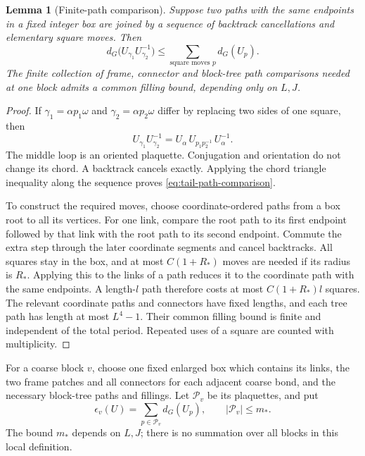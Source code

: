 \documentclass[11pt,reqno]{amsart}
\numberwithin{equation}{section}
\newtheorem{lemma}[theorem]{Lemma}
\theoremstyle{definition}
\theoremstyle{remark}
\begin{document}
\begin{lemma}[Finite-path comparison]
\label{lem:tail-path-comparison}
Suppose two paths with the same endpoints in a fixed integer
box are joined by a sequence of backtrack cancellations and
elementary square moves. Then
\begin{equation}
       d_G\bigl(U_{\gamma_1}U_{\gamma_2}^{-1}\bigr)
               \le\sum_{\text{square moves }p}d_G(U_p).
 \label{eq:tail-path-comparison}
\end{equation}
The finite collection of frame, connector and block-tree path
comparisons needed at one block admits a common filling bound,
depending only on \(L,J\).
\end{lemma}
\begin{proof}
If \(\gamma_1=\alpha p_1\omega\) and
\(\gamma_2=\alpha p_2\omega\) differ by replacing two sides
of one square, then
\[
       U_{\gamma_1}U_{\gamma_2}^{-1}
           =U_\alpha\,U_{p_1p_2^{-1}}\,U_\alpha^{-1}.
\]
The middle loop is an oriented plaquette. Conjugation and
orientation do not change its chord. A backtrack cancels
exactly. Applying the chord triangle inequality along the
sequence proves \eqref{eq:tail-path-comparison}.

To construct the required moves, choose coordinate-ordered
paths from a box root to all its vertices. For one link,
compare the root path to its first endpoint followed by
that link with the root path to its second endpoint.
Commute the extra step through the later coordinate segments
and cancel backtracks. All squares stay in the box, and at
most \(C(1+R_*)\) moves are needed if its radius is \(R_*\).
Applying this to the links of a path reduces it to the
coordinate path with the same endpoints. A length-\(l\)
path therefore costs at most \(C(1+R_*)l\) squares.
The relevant coordinate paths and connectors have fixed
lengths, and each tree path has length at most \(L^4-1\).
Their common filling bound is finite and independent of the
total period. Repeated uses of a square are counted with
multiplicity.
\end{proof}

For a coarse block \(v\), choose one fixed enlarged box which
contains its links, the two frame patches and all connectors
for each adjacent coarse bond, and the necessary block-tree
paths and fillings. Let \(\mathcal P_v\) be its plaquettes,
and put
\[
       \epsilon_v(U)=\sum_{p\in\mathcal P_v}d_G(U_p),
       \qquad |\mathcal P_v|\le m_*.
\]
The bound \(m_*\) depends on \(L,J\); there is no summation
over all blocks in this local definition.
\end{document}
